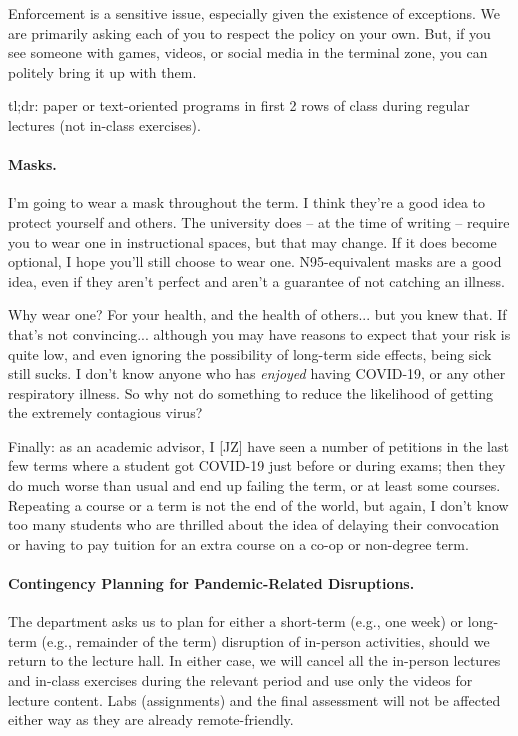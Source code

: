 Enforcement is a sensitive issue, especially given the existence of
exceptions. We are primarily asking each of you to respect the policy
on your own. But, if you see someone with games, videos, or social
media in the terminal zone, you can politely bring it up with them.

tl;dr: paper or text-oriented programs in first 2 rows of class during regular lectures (not in-class exercises).

\paragraph{Masks.}

I'm going to wear a mask throughout the term. I think they're a good idea to protect yourself and others. The university does -- at the time of writing -- require you to wear one in instructional spaces, but that may change. If it does become optional, I hope you'll still choose to wear one. N95-equivalent masks are a good idea, even if they aren't perfect and aren't a guarantee of not catching an illness. 

Why wear one? For your health, and the health of others... but you knew that. If that's not convincing... although you may have reasons to expect that your risk is quite low, and even ignoring the possibility of long-term side effects, being sick still sucks. I don't know anyone who has \textit{enjoyed} having COVID-19, or any other respiratory illness. So why not do something to reduce the likelihood of getting the extremely contagious virus?

Finally: as an academic advisor, I [JZ] have seen a number of petitions in the last few terms where a student got COVID-19 just before or during exams; then they do much worse than usual and end up failing the term, or at least some courses. Repeating a course or a term is not the end of the world, but again, I don't know too many students who are thrilled about the idea of delaying their convocation or having to pay tuition for an extra course on a co-op or non-degree term.


\paragraph{Contingency Planning for Pandemic-Related Disruptions.}
The department asks us to plan for either a short-term (e.g., one week) or long-term (e.g., remainder of the term) disruption of in-person activities, should we return to the lecture hall. In either case, we will cancel all the in-person lectures and in-class exercises during the relevant period and use only the videos for lecture content. Labs (assignments) and the final assessment will not be affected either way as they are already remote-friendly.

